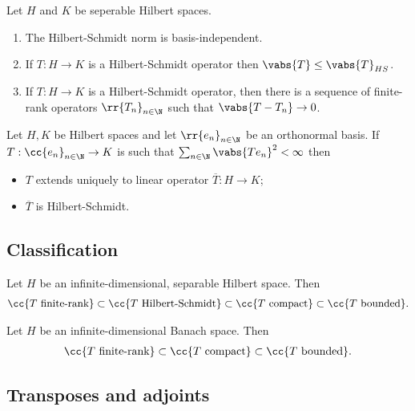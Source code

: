 \documentclass{article}
\begin{document}
\begin{theorem}
  Let $H$ and $K$ be seperable Hilbert spaces.
  \begin{enumerate}
    \item The Hilbert-Schmidt norm is basis-independent.
    \item If $T:H\to K$ is a Hilbert-Schmidt operator then
      $\vabs{T}\leq \vabs{T}_{HS}$.
    \item If $T:H\to K$ is a Hilbert-Schmidt operator, then there is a sequence
      of finite-rank operators $\rr{T_n}_{n\in\N}$ such that $\vabs{T-T_n}\to
      0$.
  \end{enumerate}
\end{theorem}

\begin{theorem}
  Let $H,K$ be Hilbert spaces and let $\rr{e_n}_{n\in\N}$ be an orthonormal
  basis. If $T:\cc{e_n}_{n\in\N}\to K$ is such that
  $\sum_{n\in\N}\vabs{Te_n}^2 < \infty$ then
  \begin{itemize}
    \item $T$ extends uniquely to linear operator $\overline T:H\to K$;
    \item $\overline T$ is Hilbert-Schmidt.
  \end{itemize}
\end{theorem}

\subsection{Classification}

\begin{theorem}
  Let $H$ be an infinite-dimensional, separable Hilbert space. Then
  \begin{align*}
    \cc{T \text{ finite-rank}}
    \subset \cc{T\text{ Hilbert-Schmidt}}
    \subset \cc{T\text{ compact}}
    \subset \cc{T\text{ bounded}}.
  \end{align*}
\end{theorem}

\begin{theorem}
  Let $H$ be an infinite-dimensional Banach space. Then
  \begin{align*}
    \cc{T \text{ finite-rank}}
    \subset \cc{T\text{ compact}}
    \subset \cc{T\text{ bounded}}.
  \end{align*}
\end{theorem}


\subsection{Transposes and adjoints}
\end{document}
